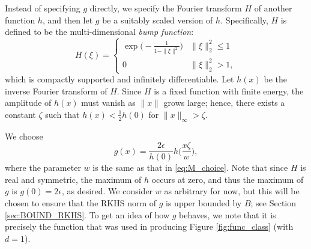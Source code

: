 \documentclass[english,onecolumn,final,11pt]{IEEEtran} %
\begin{document}
Instead of specifying $g$ directly, we specify the Fourier transform $H$ of another function $h$, and then let $g$ be a suitably scaled version of $h$.  Specifically, $H$ is defined to be the multi-dimensional \emph{bump function}:
\begin{equation}
    H(\xi) = 
    \begin{cases}
        \exp\bigg( - \frac{1}{1-\|\xi\|^2} \bigg) & \|\xi\|_2^2 \le 1 \\
        0 & \|\xi\|_2^2 > 1,
    \end{cases} \label{eq:Hf}
\end{equation}
which is  compactly supported and infinitely differentiable.  Let $h(x)$ be the inverse Fourier transform of $H$.  Since $H$ is a fixed function with finite energy, the amplitude of $h(x)$ must vanish as $\|x\|$ grows large; hence, there exists a constant $\zeta$ such that $h(x) < \frac{1}{2} h(0)$ for $\|x\|_{\infty} > \zeta$.  %

We choose 
\begin{equation}
    g(x) = \frac{2\epsilon}{h(0)} h\Big( \frac{x\zeta}{w} \Big), \label{eq:g_choice}
\end{equation}
where the parameter $w$ is the same as that in \eqref{eq:M_choice}.  Note that since $H$ is real and symmetric, the maximum of $h$ occurs at zero, and thus the maximum of $g$ is $g(0) = 2\epsilon$, as desired.  We consider $w$ as arbitrary for now, but this will be chosen to ensure that the RKHS norm of $g$ is upper bounded by $B$; see Section \ref{sec:BOUND_RKHS}.  To get an idea of how $g$ behaves, we note that it is precisely the function that was used in producing Figure \ref{fig:func_class} (with $d=1$).
\end{document}
